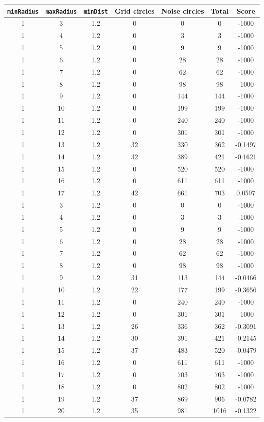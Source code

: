 \documentclass[letterpaper, 12pt]{article}
\begin{document}
\begin{longtable}{|c|c|c|c|c|c|c|}
\hline
\textbf{\texttt{minRadius}} & \textbf{\texttt{maxRadius}} & \textbf{\texttt{minDist}} & \textbf{Grid circles} & \textbf{Noise circles} & \textbf{Total} & \textbf{Score} \\
\hline
1 & 3 & 1.2 & 0 & 0 & 0 & -1000 \\
\hline
1 & 4 & 1.2 & 0 & 3 & 3 & -1000 \\
\hline
1 & 5 & 1.2 & 0 & 9 & 9 & -1000 \\
\hline
1 & 6 & 1.2 & 0 & 28 & 28 & -1000 \\
\hline
1 & 7 & 1.2 & 0 & 62 & 62 & -1000 \\
\hline
1 & 8 & 1.2 & 0 & 98 & 98 & -1000 \\
\hline
1 & 9 & 1.2 & 0 & 144 & 144 & -1000 \\
\hline
1 & 10 & 1.2 & 0 & 199 & 199 & -1000 \\
\hline
1 & 11 & 1.2 & 0 & 240 & 240 & -1000 \\
\hline
1 & 12 & 1.2 & 0 & 301 & 301 & -1000 \\
\hline
1 & 13 & 1.2 & 32 & 330 & 362 & -0.1497 \\
\hline
1 & 14 & 1.2 & 32 & 389 & 421 & -0.1621 \\
\hline
1 & 15 & 1.2 & 0 & 520 & 520 & -1000 \\
\hline
1 & 16 & 1.2 & 0 & 611 & 611 & -1000 \\
\hline
1 & 17 & 1.2 & 42 & 661 & 703 & 0.0597 \\
\hline
1 & 3 & 1.2 & 0 & 0 & 0 & -1000 \\
\hline
1 & 4 & 1.2 & 0 & 3 & 3 & -1000 \\
\hline
1 & 5 & 1.2 & 0 & 9 & 9 & -1000 \\
\hline
1 & 6 & 1.2 & 0 & 28 & 28 & -1000 \\
\hline
1 & 7 & 1.2 & 0 & 62 & 62 & -1000 \\
\hline
1 & 8 & 1.2 & 0 & 98 & 98 & -1000 \\
\hline
1 & 9 & 1.2 & 31 & 113 & 144 & -0.0466 \\
\hline
1 & 10 & 1.2 & 22 & 177 & 199 & -0.3656 \\
\hline
1 & 11 & 1.2 & 0 & 240 & 240 & -1000 \\
\hline
1 & 12 & 1.2 & 0 & 301 & 301 & -1000 \\
\hline
1 & 13 & 1.2 & 26 & 336 & 362 & -0.3091 \\
\hline
1 & 14 & 1.2 & 30 & 391 & 421 & -0.2145 \\
\hline
1 & 15 & 1.2 & 37 & 483 & 520 & -0.0479 \\
\hline
1 & 16 & 1.2 & 0 & 611 & 611 & -1000 \\
\hline
1 & 17 & 1.2 & 0 & 703 & 703 & -1000 \\
\hline
1 & 18 & 1.2 & 0 & 802 & 802 & -1000 \\
\hline
1 & 19 & 1.2 & 37 & 869 & 906 & -0.0782 \\
\hline
1 & 20 & 1.2 & 35 & 981 & 1016 & -0.1322 \\
\hline
\end{longtable}
\end{document}
